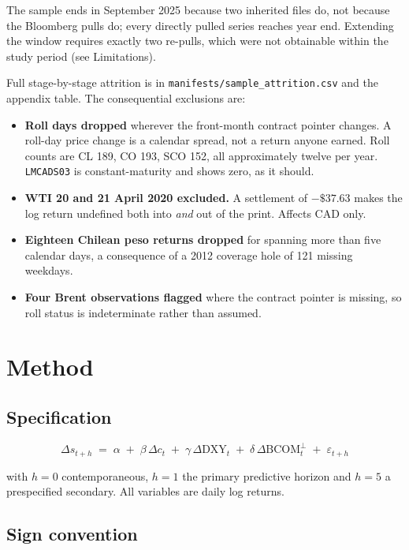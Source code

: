 \documentclass[11pt,a4paper]{article}
\begin{document}
The sample ends in September 2025 because two inherited files do, not because
the Bloomberg pulls do; every directly pulled series reaches year end.
Extending the window requires exactly two re-pulls, which were not obtainable
within the study period (see Limitations).

Full stage-by-stage attrition is in \texttt{manifests/sample\_attrition.csv} and
the appendix table. The consequential exclusions are:

\begin{itemize}\itemsep2pt
\item \textbf{Roll days dropped} wherever the front-month contract pointer
changes. A roll-day price change is a calendar spread, not a return anyone
earned. Roll counts are CL 189, CO 193, SCO 152, all approximately twelve per
year. \texttt{LMCADS03} is constant-maturity and shows zero, as it should.
\item \textbf{WTI 20 and 21 April 2020 excluded.} A settlement of $-\$37.63$
makes the log return undefined both into \emph{and} out of the print. Affects
CAD only.
\item \textbf{Eighteen Chilean peso returns dropped} for spanning more than five
calendar days, a consequence of a 2012 coverage hole of 121 missing weekdays.
\item \textbf{Four Brent observations flagged} where the contract pointer is
missing, so roll status is indeterminate rather than assumed.
\end{itemize}

\section{Method}

\subsection{Specification}

\begin{equation}
\Delta s_{t+h} \;=\; \alpha \;+\; \beta\,\Delta c_t \;+\; \gamma\,\Delta \mathrm{DXY}_t
\;+\; \delta\,\Delta \mathrm{BCOM}^{\perp}_t \;+\; \varepsilon_{t+h}
\label{eq:spec}
\end{equation}

with $h=0$ contemporaneous, $h=1$ the primary predictive horizon and $h=5$ a
prespecified secondary. All variables are daily log returns.

\subsection{Sign convention}
\end{document}
